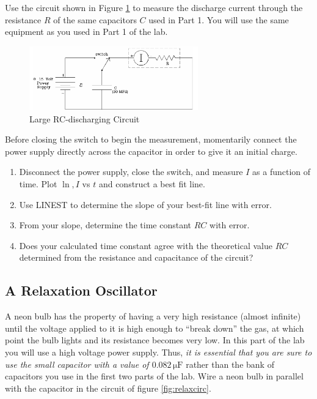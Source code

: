 Use the circuit shown in Figure \ref{fig:largercdischarge} to measure the discharge current through the resistance $R$ of the same capacitors $C$ used in Part 1. You will use the same equipment as you used in Part 1 of the lab. \myskip

\begin{figure}[h]
   \begin{center}
       \includegraphics[width=0.65\textwidth]{./Exp3/pic/image7.png}
   \end{center}
   \caption{Large RC-discharging Circuit}
   \label{fig:largercdischarge}
\end{figure}

Before closing the switch to begin the measurement, momentarily connect the power supply directly across the capacitor in order to give it an initial charge.
\begin{enumerate}
  \item Disconnect the power supply, close the switch, and measure $I$ as a function of time. Plot $\ln,I$ vs $t$ and construct a best fit line.
  \item Use LINEST to determine the slope of your best-fit line with error.
  \item From your slope, determine the time constant $RC$ with error.
  \item Does your calculated time constant agree with the theoretical value $RC$ determined from the resistance and capacitance of the circuit?
\end{enumerate}

\subsection{A Relaxation Oscillator}

A neon bulb has the property of having a very high resistance (almost infinite) until the voltage applied to it is high enough to ``break down'' the gas, at which point the bulb lights and its resistance becomes very low. In this part of the lab you will use a high voltage power supply. Thus, \emph{it is essential that you are sure to use the small capacitor with a value of $0.082\,\mathrm{\mu F}$} rather than the bank of capacitors you use in the first two parts of the lab. Wire a neon bulb in parallel with the capacitor in the circuit of figure \ref{fig:relaxcirc}.\myskip

